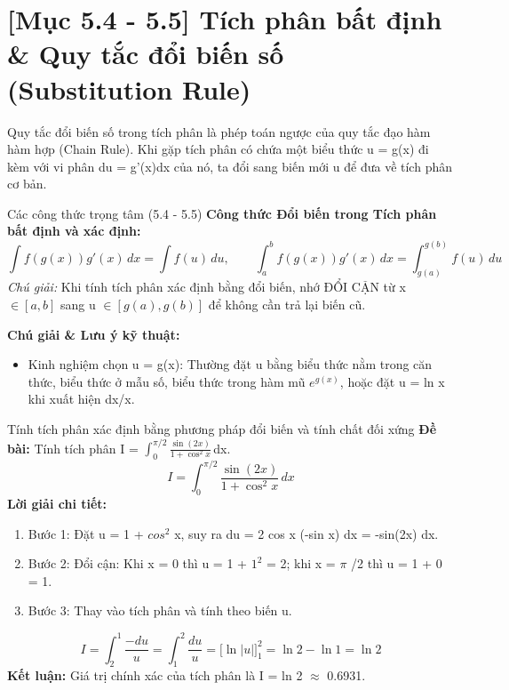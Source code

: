 \documentclass[11pt,a4paper,oneside]{book}
\begin{document}
\section{[Mục 5.4 - 5.5] Tích phân bất định \& Quy tắc đổi biến số (Substitution Rule)}
Quy tắc đổi biến số trong tích phân là phép toán ngược của quy tắc đạo hàm hàm hợp (Chain Rule). Khi gặp tích phân có chứa một biểu thức u = g(x) đi kèm với vi phân du = g'(x)dx của nó, ta đổi sang biến mới u để đưa về tích phân cơ bản.

\begin{congthuc}{Các công thức trọng tâm (5.4 - 5.5)}
\noindent\textbf{Công thức Đổi biến trong Tích phân bất định và xác định:}
\[ \int f(g(x))g'(x)\,dx = \int f(u)\,du, \qquad \int_a^b f(g(x))g'(x)\,dx = \int_{g(a)}^{g(b)} f(u)\,du \]
\noindent\textit{Chú giải:} Khi tính tích phân xác định bằng đổi biến, nhớ ĐỔI CẬN từ x $\in  [a, b]$ sang u $\in  [g(a), g(b)]$ để không cần trả lại biến cũ.\\[4pt]
\end{congthuc}

\noindent\textbf{Chú giải \& Lưu ý kỹ thuật:}
\begin{itemize}[leftmargin=1.5em, itemsep=2pt]
  \item Kinh nghiệm chọn u = g(x): Thường đặt u bằng biểu thức nằm trong căn thức, biểu thức ở mẫu số, biểu thức trong hàm mũ $e^{g(x)}$, hoặc đặt u = ln x khi xuất hiện dx/x.
\end{itemize}

\begin{vidu}{Tính tích phân xác định bằng phương pháp đổi biến và tính chất đối xứng}
\textbf{Đề bài:} Tính tích phân I = $\int_0^{\pi/2} \frac{\sin(2x)}{1 + \cos^2 x}$\,dx.
\[ I = \int_0^{\pi/2} \frac{\sin(2x)}{1 + \cos^2 x}\,dx \]
\textbf{Lời giải chi tiết:}
\begin{enumerate}[leftmargin=1.5em, itemsep=2pt]
  \item Bước 1: Đặt u = 1 + $cos^2$ x, suy ra du = 2 cos x (-sin x) dx = -sin(2x) dx.
  \item Bước 2: Đổi cận: Khi x = 0 thì u = 1 + $1^2$ = 2; khi x = $\pi$ /2 thì u = 1 + 0 = 1.
  \item Bước 3: Thay vào tích phân và tính theo biến u.
\end{enumerate}
\[ I = \int_2^1 \frac{-du}{u} = \int_1^2 \frac{du}{u} = \Big[\ln|u|\Big]_1^2 = \ln 2 - \ln 1 = \ln 2 \]
\noindent\textbf{Kết luận:} Giá trị chính xác của tích phân là I = ln 2 $\approx$  0.6931.
\end{vidu}
\end{document}
